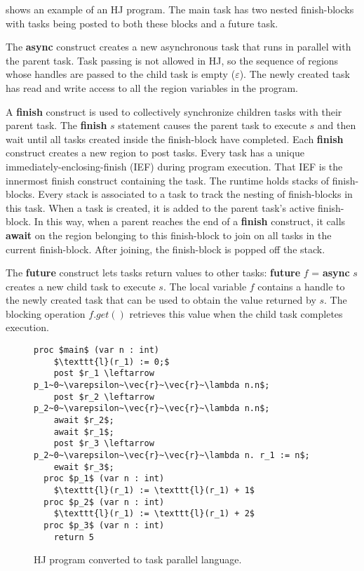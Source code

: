  shows an example of an HJ program. The main task has two nested finish-blocks with tasks being posted to both these blocks and a future task.

The \textbf{async} construct creates a new asynchronous task that runs in parallel with the parent task. Task passing is not allowed in HJ, so the sequence of regions whose handles are passed to the child task is empty ($\varepsilon$). The newly created task has read and write access to all the region variables in the program. 

A \textbf{finish} construct is used to collectively synchronize children tasks with their parent task. The \textbf{finish} $s$ statement causes the parent task to execute $s$ and then wait until all tasks created inside the finish-block have completed. Each \textbf{finish} construct creates a new region to post tasks. Every task has a unique immediately-enclosing-finish (IEF) during program execution. That IEF is the innermost finish construct containing the task. The runtime holds stacks of finish-blocks. Every stack is associated to a task to track the nesting of finish-blocks in this task. When a task is created, it is added to the parent task's active finish-block. In this way, when a parent reaches the end of a \textbf{finish} construct, it calls \textbf{await} on the region belonging to this finish-block to join on all tasks in the current finish-block. After joining, the finish-block is popped off the stack.

The \textbf{future} construct lets tasks return values to other tasks: \textbf{future} $f$ = \textbf{async} $s$ creates a new child task to execute $s$. The local variable $f$ contains a handle to the newly created task that can be used to obtain the value returned by $s$. The blocking operation $f.get()$ retrieves this value when the child task completes execution.

\begin{figure}
  \begin{center}
    \begin{lstlisting}[mathescape=true]
  proc $main$ (var n : int)
  	$\texttt{l}(r_1) := 0;$
	post $r_1 \leftarrow p_1~0~\varepsilon~\vec{r}~\vec{r}~\lambda n.n$;
	post $r_2 \leftarrow p_2~0~\varepsilon~\vec{r}~\vec{r}~\lambda n.n$;
	await $r_2$;
	await $r_1$;
	post $r_3 \leftarrow p_2~0~\varepsilon~\vec{r}~\vec{r}~\lambda n. r_1 := n$;
	ewait $r_3$;	
  proc $p_1$ (var n : int)
  	$\texttt{l}(r_1) := \texttt{l}(r_1) + 1$
  proc $p_2$ (var n : int)
  	$\texttt{l}(r_1) := \texttt{l}(r_1) + 2$
  proc $p_3$ (var n : int)
  	return 5
\end{lstlisting}
  \end{center}
  \caption{HJ program converted to task parallel language.}
  \label{fig:hj-async-fin-converted}
\end{figure}

